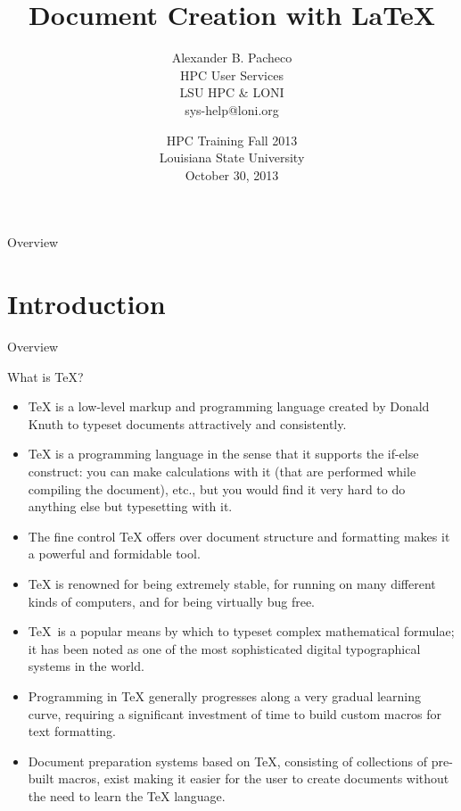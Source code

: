 \documentclass[style=lsuloni,orient=landscape]{powerdot}
\title{\color{black}Document Creation with \LaTeX{}}
\author{Alexander B. Pacheco\\
  HPC User Services \\
  LSU HPC \& LONI\\
  sys-help@loni.org
}
\date{HPC Training Fall 2013\\
  Louisiana State University\\
  October 30, 2013}
\begin{document}
\maketitle
\begin{wideslide}[toc=,bm=]{Overview}
  \tableofcontents[content=sections]
\end{wideslide}
\scriptsize

\section[slide=false]{Introduction}
\begin{wideslide}[toc=,bm=]{Overview}
  \tableofcontents[content=currentsection,type=0]
\end{wideslide}
\begin{wideslide}[bm={What is \TeX{} \& \LaTeX?}]{What is \TeX{}?}
  \begin{itemize}
  \item \TeX{} is a low-level markup and programming language created by Donald Knuth to typeset documents attractively and consistently.
  \item \TeX{} is a programming language in the sense that it supports the if-else construct: you can make calculations with it (that are performed while compiling the document), etc., but you would find it very hard to do anything else but typesetting with it.
  \item The fine control \TeX{} offers over document structure and formatting makes it a powerful and formidable tool.
  \item \TeX{} is renowned for being extremely stable, for running on many different kinds of computers, and for being virtually bug free.
  \item \TeX\, is a popular means by which to typeset complex mathematical formulae; it has been noted as one of the most sophisticated digital typographical systems in the world.
  \item Programming in \TeX{} generally progresses along a very gradual learning curve, requiring a significant investment of time to build custom macros for text formatting.
  \item Document preparation systems based on \TeX{}, consisting of collections of pre-built macros, exist making it easier for the user to create documents without the need to learn the \TeX{} language.
  \end{itemize}
\end{wideslide}	
\end{document}
